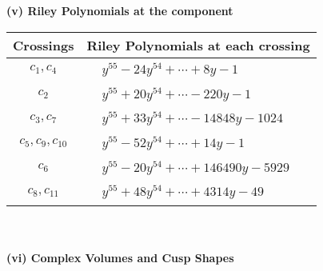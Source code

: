 \documentclass[1p]{elsarticle_modified}
\theoremstyle{definition}
\begin{document}
\newpage\renewcommand{\arraystretch}{1}
\flushleft \textbf{(v) Riley Polynomials at the component}\newline \\
\begin{tabular}{m{50pt}|m{274pt}}
Crossings & \hspace{64pt}Riley Polynomials at each crossing \\
\hline $$\begin{aligned}c_{1},c_{4}\end{aligned}$$&$\begin{aligned}
&y^{55}-24 y^{54}+\cdots+8 y-1
\end{aligned}$\\
\hline $$\begin{aligned}c_{2}\end{aligned}$$&$\begin{aligned}
&y^{55}+20 y^{54}+\cdots-220 y-1
\end{aligned}$\\
\hline $$\begin{aligned}c_{3},c_{7}\end{aligned}$$&$\begin{aligned}
&y^{55}+33 y^{54}+\cdots-14848 y-1024
\end{aligned}$\\
\hline $$\begin{aligned}c_{5},c_{9},c_{10}\end{aligned}$$&$\begin{aligned}
&y^{55}-52 y^{54}+\cdots+14 y-1
\end{aligned}$\\
\hline $$\begin{aligned}c_{6}\end{aligned}$$&$\begin{aligned}
&y^{55}-20 y^{54}+\cdots+146490 y-5929
\end{aligned}$\\
\hline $$\begin{aligned}c_{8},c_{11}\end{aligned}$$&$\begin{aligned}
&y^{55}+48 y^{54}+\cdots+4314 y-49
\end{aligned}$\\
\hline
\end{tabular}\\~\\
\newpage\flushleft \textbf{(vi) Complex Volumes and Cusp Shapes}
\end{document}
